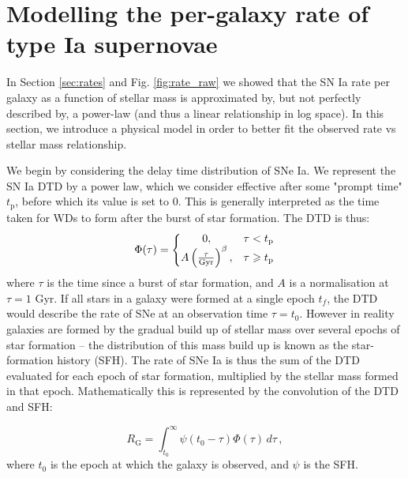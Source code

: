 \documentclass[fleqn,usenatbib]{mnras}
\begin{document}
\section{Modelling the per-galaxy rate of type Ia supernovae}
 \label{sec:model}
 
In Section \ref{sec:rates} and Fig. \ref{fig:rate_raw} we showed that the SN Ia rate per galaxy as a function of stellar mass is approximated by, but not perfectly described by, a power-law (and thus a linear relationship in log space). In this section, we introduce a physical model in order to better fit the observed rate vs stellar mass relationship. 

We begin by considering the delay time distribution of SNe Ia.
We represent the SN Ia DTD by a power law, which we consider effective after some "prompt time" $t_{\mathrm{p}}$, before which its value is set to 0. This is generally interpreted as the time taken for WDs to form after the burst of star formation. The DTD is thus:
\begin{equation}
 \Phi(\tau) = \left\{
    \begin{array}{@{}cc@{}}
    0 , & \tau < t_{\mathrm{p}} \\
    A\left(\frac{\tau}{\mathrm{Gyr}}\right)^{\beta} , & \tau \geq t_{\mathrm{p}}
    \end{array}\right.
        \label{eq:dtd}
\end{equation} 
where $\tau$ is the time since a burst of star formation, and $A$ is a normalisation at $\tau=1$ Gyr. If all stars in a galaxy were formed at a single epoch $t_f$, the DTD would describe the rate of SNe at an observation time $\tau = t_0$. However in reality galaxies are formed by the gradual build up of stellar mass over several epochs of star formation -- the distribution of this mass build up is known as the star-formation history (SFH). The rate of SNe Ia is thus the sum of the DTD evaluated for each epoch of star formation, multiplied by the stellar mass formed in that epoch. Mathematically this is represented by the convolution of the DTD and SFH:
 
\begin{equation}
    R_{\mathrm{G}} = \int_{t_0}^{\infty} \psi(t_0-\tau)\Phi(\tau)\,d\tau \,,
    \label{eq:galaxy_rate}
\end{equation}
where $t_0$ is the epoch at which the galaxy is observed, and $\psi$ is the SFH. 
\end{document}
